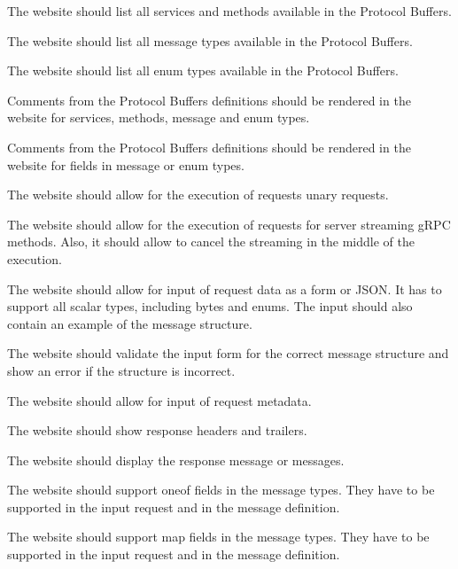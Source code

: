 The website should list all services and methods available in the Protocol Buffers.

The website should list all message types available in the Protocol Buffers.

The website should list all enum types available in the Protocol Buffers.

Comments from the Protocol Buffers definitions should be rendered in the website for services, methods, message and enum types.

Comments from the Protocol Buffers definitions should be rendered in the website for fields in message or enum types.

The website should allow for the execution of requests unary requests.

The website should allow for the execution of requests for server streaming gRPC methods.
Also, it should allow to cancel the streaming in the middle of the execution.

The website should allow for input of request data as a form or JSON\@.
It has to support all scalar types, including bytes and enums.
The input should also contain an example of the message structure.

The website should validate the input form for the correct message structure and show an error if the structure is incorrect.

The website should allow for input of request metadata.

The website should show response headers and trailers.

The website should display the response message or messages.

The website should support oneof fields in the message types.
They have to be supported in the input request and in the message definition.

The website should support map fields in the message types.
They have to be supported in the input request and in the message definition.

